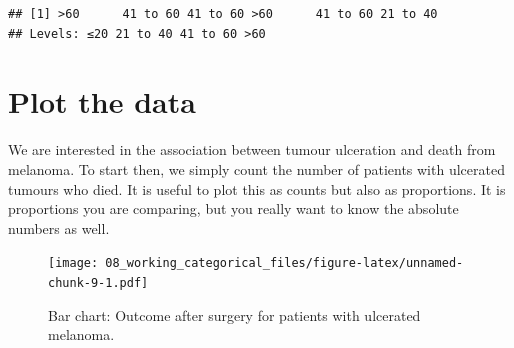 \documentclass[
  12pt,
  krantz2]{krantz}
\makeatletter
\newenvironment{Shaded}{\begin{snugshade}}{\end{snugshade}}
\newcommand{\DataTypeTok}[1]{\textcolor[rgb]{0.13,0.29,0.53}{#1}}
\newcommand{\KeywordTok}[1]{\textcolor[rgb]{0.13,0.29,0.53}{\textbf{#1}}}
\newcommand{\NormalTok}[1]{#1}
\newcommand{\OperatorTok}[1]{\textcolor[rgb]{0.81,0.36,0.00}{\textbf{#1}}}
\newcommand{\StringTok}[1]{\textcolor[rgb]{0.31,0.60,0.02}{#1}}
\newenvironment{kframe}{%
\medskip{}
\setlength{\fboxsep}{.8em}
 \def\at@end@of@kframe{}%
 \ifinner\ifhmode%
  \def\at@end@of@kframe{\end{minipage}}%
  \begin{minipage}{\columnwidth}%
 \fi\fi%
 \def\FrameCommand##1{\hskip\@totalleftmargin \hskip-\fboxsep
 \colorbox{shadecolor}{##1}\hskip-\fboxsep
     \hskip-\linewidth \hskip-\@totalleftmargin \hskip\columnwidth}%
 \MakeFramed {\advance\hsize-\width
   \@totalleftmargin\z@ \linewidth\hsize
   \@setminipage}}%
 {\par\unskip\endMakeFramed%
 \at@end@of@kframe}
\renewenvironment{Shaded}{\begin{kframe}}{\end{kframe}}
\makeatother
\begin{document}
\begin{verbatim}
## [1] >60      41 to 60 41 to 60 >60      41 to 60 21 to 40
## Levels: ≤20 21 to 40 41 to 60 >60
\end{verbatim}

\hypertarget{plot-the-data-5}{%
\section{Plot the data}\label{plot-the-data-5}}

We are interested in the association between tumour ulceration and death from melanoma.
To start then, we simply count the number of patients with ulcerated tumours who died.
It is useful to plot this as counts but also as proportions.
It is proportions you are comparing, but you really want to know the absolute numbers as well.

\begin{Shaded}
\end{Shaded}

\begin{figure}
\centering
\texttt{[image: 08\_working\_categorical\_files/figure-latex/unnamed-chunk-9-1.pdf]}
\caption{\label{fig:unnamed-chunk-9}Bar chart: Outcome after surgery for patients with ulcerated melanoma.}
\end{figure}
\end{document}
